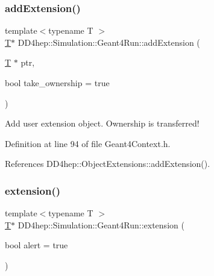 \hypertarget{class_d_d4hep_1_1_simulation_1_1_geant4_run_a6728686af7406ddfd13f20e7f32f567c}{}\label{class_d_d4hep_1_1_simulation_1_1_geant4_run_a6728686af7406ddfd13f20e7f32f567c} 
\subsubsection{\texorpdfstring{add\+Extension()}{addExtension()}\hspace{0.1cm}{\footnotesize\ttfamily [2/2]}}
{\footnotesize\ttfamily template$<$typename T $>$ \\
\hyperlink{class_t}{T}$\ast$ D\+D4hep\+::\+Simulation\+::\+Geant4\+Run\+::add\+Extension (\begin{DoxyParamCaption}\item[{\hyperlink{class_t}{T} $\ast$}]{ptr,  }\item[{bool}]{take\+\_\+ownership = {\ttfamily true} }\end{DoxyParamCaption})\hspace{0.3cm}{\ttfamily [inline]}}



Add user extension object. Ownership is transferred! 



Definition at line 94 of file Geant4\+Context.\+h.



References D\+D4hep\+::\+Object\+Extensions\+::add\+Extension().

\hypertarget{class_d_d4hep_1_1_simulation_1_1_geant4_run_ac70074dcc18216ef0a62fa1b646ff83f}{}\label{class_d_d4hep_1_1_simulation_1_1_geant4_run_ac70074dcc18216ef0a62fa1b646ff83f} 
\subsubsection{\texorpdfstring{extension()}{extension()}}
{\footnotesize\ttfamily template$<$typename T $>$ \\
\hyperlink{class_t}{T}$\ast$ D\+D4hep\+::\+Simulation\+::\+Geant4\+Run\+::extension (\begin{DoxyParamCaption}\item[{bool}]{alert = {\ttfamily true} }\end{DoxyParamCaption})\hspace{0.3cm}{\ttfamily [inline]}}



